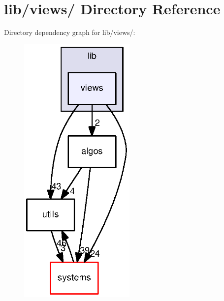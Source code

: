 \section{lib/views/ \-Directory \-Reference}
\label{dir_d2ada1a8c4e3ac8eca80b82469fcadff}
\-Directory dependency graph for lib/views/\-:
\nopagebreak
\begin{figure}[H]
\begin{center}
\leavevmode
\includegraphics[width=161pt]{dir_d2ada1a8c4e3ac8eca80b82469fcadff_dep}
\end{center}
\end{figure}
